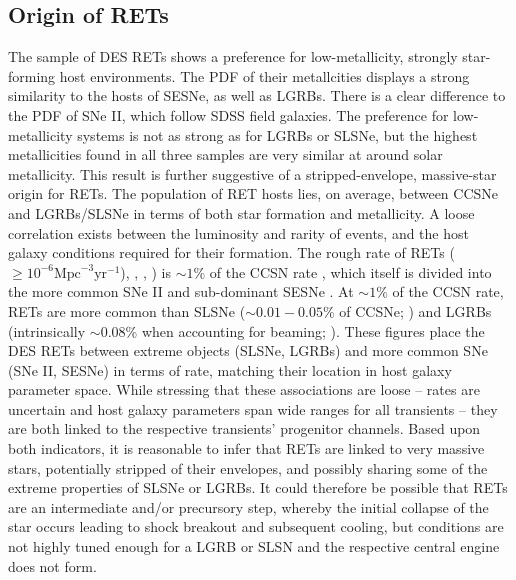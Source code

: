 \documentclass[fleqn,usenatbib,]{mnras}
\begin{document}
\subsection{Origin of RETs \label{subsec:disc_origin}}

The sample of DES RETs shows a preference for low-metallicity, strongly star-forming host environments. The PDF of their metallcities displays a strong similarity to the hosts of SESNe, as well as LGRBs. There is a clear difference to the PDF of SNe II, which follow SDSS field galaxies. The preference for low-metallicity systems is not as strong as for LGRBs or SLSNe, but the highest metallicities found in all three samples are very similar at around solar metallicity. This result is further suggestive of a stripped-envelope, massive-star origin for RETs. 
The population of RET hosts lies, on average, between CCSNe and LGRBs/SLSNe in terms of both star formation and metallicity. A loose correlation exists between the luminosity and rarity of events, and the host galaxy conditions required for their formation. The rough rate of RETs ($\geq 10^{-6} \mathrm{Mpc}^{-3} \mathrm{yr}^{-1}$), \citealt{Drout2014}, , \citealt{Tampo2020}) is $\sim1\%$ of the CCSN rate \citep{Li2011,Horiuchi2011,Strolger2015}, which itself is divided into the more common SNe II and sub-dominant SESNe \citep{Kelly2012,Frohmaier2020}. At $\sim1\%$ of the CCSN rate, RETs are more common than SLSNe ($\sim0.01 - 0.05\%$ of CCSNe; \citealt{McCrum2015,Prajs2017,Frohmaier2020}) and LGRBs (intrinsically $\sim0.08\%$ when accounting for beaming; \citealt{Graham2016}). These figures place the DES RETs between extreme objects (SLSNe, LGRBs) and more common SNe (SNe II, SESNe) in terms of rate, matching their location in host galaxy parameter space. While stressing that these associations are loose – rates are uncertain and host galaxy parameters span wide ranges for all transients – they are both linked to the respective transients' progenitor channels. Based upon both indicators, it is reasonable to infer that RETs are linked to very massive stars, potentially stripped of their envelopes, and possibly sharing some of the extreme properties of SLSNe or LGRBs. It could therefore be possible that RETs are an intermediate and/or precursory step, whereby the initial collapse of the star occurs leading to shock breakout and subsequent cooling, but conditions are not highly tuned enough for a LGRB or SLSN and the respective central engine does not form. 
\end{document}
